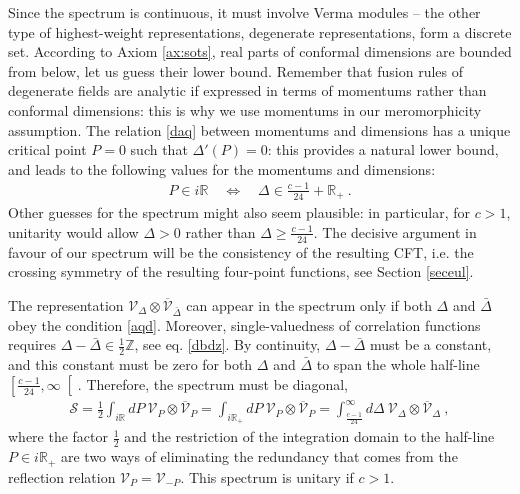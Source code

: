 \documentclass[12pt, a4paper, notitlepage, twoside]{report}
\numberwithin{equation}{section}
\theoremstyle{break}
\begin{document}
Since the spectrum is continuous, it must involve Verma modules -- the other type of highest-weight representations, degenerate representations, form a discrete set. 
According to Axiom \ref{ax:sots}, real parts of conformal dimensions are bounded from below, let us guess their lower bound. Remember that fusion rules of degenerate fields are analytic if expressed in terms of momentums rather than conformal dimensions: this is why we use momentums in our meromorphicity assumption. The relation \eqref{daq} between momentums and dimensions has a unique critical point $P=0$ such that $\Delta'(P)=0$: this provides a natural lower bound, and leads to the following values for the momentums and dimensions:
\begin{align}
 P \in i{\mathbb{R}} \quad \iff \quad \Delta \in \frac{c-1}{24}+\mathbb{R}_+\ .
\label{aqd}
\end{align}
Other guesses for the spectrum might also seem plausible: in particular, for $c>1$, unitarity would allow $\Delta> 0$ rather than $\Delta \geq \frac{c-1}{24}$. 
The decisive argument in favour of our spectrum will be the consistency of the resulting CFT, i.e. 
the crossing symmetry of the resulting four-point functions, see Section \ref{seceul}.

The representation $\mathcal{V}_\Delta\otimes \overline{\mathcal{V}}_{\bar{\Delta}}$ can appear in the spectrum only if both 
$\Delta$ and $\bar{\Delta}$ obey the condition \eqref{aqd}. 
Moreover, single-valuedness of correlation functions requires $\Delta-\bar{\Delta}\in {\frac12\mathbb{Z}} $, see eq. \eqref{dbdz}.
By continuity, $\Delta-\bar{\Delta}$ must be a constant, and this constant must be zero for both $\Delta$ and $\bar{\Delta}$ to span the whole half-line $\left[\frac{c-1}{24},\infty\right[$.
Therefore, the spectrum must be diagonal,
\begin{align}
 \boxed{ \mathcal{S}= \frac12\int_{i{\mathbb{R}}} dP\ \mathcal{V}_P \otimes \overline{\mathcal{V}}_P =\int_{i{\mathbb{R}_+}} dP\ \mathcal{V}_P \otimes \overline{\mathcal{V}}_P = \int_{\frac{c-1}{24}}^\infty d\Delta\ \mathcal{V}_\Delta\otimes \overline{\mathcal{V}}_\Delta} \ ,
\label{sad}
\end{align}
where the  factor $\frac12$ and the restriction of the integration domain to the half-line $P\in i\mathbb{R}_+$ are two ways of
eliminating the redundancy that comes from the reflection relation $\mathcal{V}_P=\mathcal{V}_{-P}$. This spectrum is unitary if $c>1$.
\end{document}
